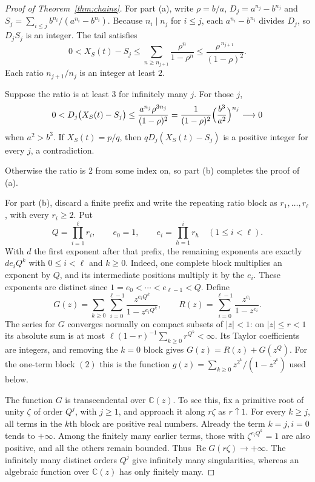 \documentclass[11pt]{article}
\begin{document}
\begin{proof}[Proof of Theorem~\ref{thm:chains}]
For part (a), write $\rho=b/a$, $D_j=a^{n_j}-b^{n_j}$ and
$S_j=\sum_{i\le j}b^{n_i}/(a^{n_i}-b^{n_i})$.  Because $n_i\mid n_j$ for
$i\le j$, each $a^{n_i}-b^{n_i}$ divides $D_j$, so $D_jS_j$ is an integer.  The
tail satisfies
\[
 0<X_S(t)-S_j\le\sum_{n\ge n_{j+1}}\frac{\rho^n}{1-\rho^n}
 \le\frac{\rho^{\,n_{j+1}}}{(1-\rho)^2}.
\]
Each ratio $n_{j+1}/n_j$ is an integer at least $2$.

Suppose the ratio is at least $3$ for infinitely many $j$.  For those $j$,
\[
 0<D_j\bigl(X_S(t)-S_j\bigr)\le\frac{a^{n_j}\rho^{3n_j}}{(1-\rho)^2}
 =\frac{1}{(1-\rho)^2}\Bigl(\frac{b^3}{a^2}\Bigr)^{n_j}\longrightarrow0
\]
when $a^2>b^3$.  If $X_S(t)=p/q$, then $qD_j(X_S(t)-S_j)$ is a positive
integer for every $j$, a contradiction.

Otherwise the ratio is $2$ from some index on, so part (b) completes the
proof of (a).

For part (b), discard a finite prefix and write the repeating ratio block as
$r_1,\ldots,r_\ell$, with every $r_i\ge2$. Put
\[
 Q=\prod_{i=1}^{\ell}r_i,\qquad e_0=1,\qquad
 e_i=\prod_{h=1}^i r_h\quad(1\le i<\ell).
\]
With $d$ the first exponent after that prefix, the remaining exponents are exactly
$d e_iQ^k$ with $0\le i<\ell$ and $k\ge0$. Indeed, one complete block
multiplies an exponent by $Q$, and its intermediate positions multiply it
by the $e_i$. These exponents are distinct since
$1=e_0<\cdots<e_{\ell-1}<Q$. Define
\[
 G(z)=\sum_{k\ge0}\sum_{i=0}^{\ell-1}
          \frac{z^{e_iQ^k}}{1-z^{e_iQ^k}},\qquad
 R(z)=\sum_{i=0}^{\ell-1}\frac{z^{e_i}}{1-z^{e_i}}.
\]
The series for $G$ converges normally on compact subsets of $|z|<1$:
on $|z|\le r<1$ its absolute sum is at most
$\ell(1-r)^{-1}\sum_{k\ge0}r^{Q^k}<\infty$. Its Taylor coefficients
are integers, and removing the $k=0$ block gives
$G(z)=R(z)+G(z^Q)$.
For the one-term block $(2)$ this is the function
$g(z)=\sum_{k\ge0}z^{2^k}/(1-z^{2^k})$ used below.

The function $G$ is transcendental over $\mathbb C(z)$. To see this,
fix a primitive root of unity $\zeta$ of order $Q^j$, with $j\ge1$,
and approach it along $r\zeta$ as $r\uparrow1$. For every $k\ge j$,
all terms in the $k$th block are positive real numbers. Already the term
$k=j,i=0$ tends to $+\infty$. Among the finitely many earlier terms,
those with $\zeta^{e_iQ^k}=1$ are also positive, and all the others remain
bounded. Thus $\operatorname{Re}G(r\zeta)\to+\infty$.
The infinitely many distinct orders $Q^j$ give infinitely many singularities,
whereas an algebraic function over $\mathbb C(z)$ has only finitely many.


\end{proof}
\end{document}
